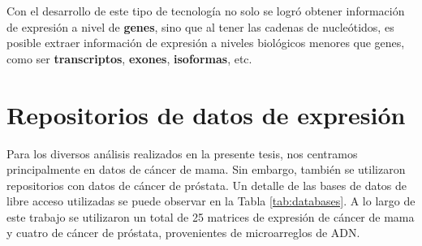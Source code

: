 \documentclass[12pt,twoside]{reedthesis}
\begin{document}
\par

Con el desarrollo de este tipo de tecnología no solo se logró obtener información de expresión a nivel de \textbf{genes}, sino que al tener las cadenas de nucleótidos, es posible extraer información de expresión a niveles biológicos menores que genes, como ser \textbf{transcriptos}, \textbf{exones}, \textbf{isoformas}, etc.

\hypertarget{sec:repos}{%
\section{Repositorios de datos de expresión}\label{sec:repos}}

Para los diversos análisis realizados en la presente tesis, nos centramos principalmente en datos de cáncer de mama. Sin embargo, también se utilizaron repositorios con datos de cáncer de próstata. Un detalle de las bases de datos de libre acceso utilizadas se puede observar en la Tabla \ref{tab:databases}. A lo largo de este trabajo se utilizaron un total de 25 matrices de expresión de cáncer de mama y cuatro de cáncer de próstata, provenientes de microarreglos de ADN.

\par
\end{document}
